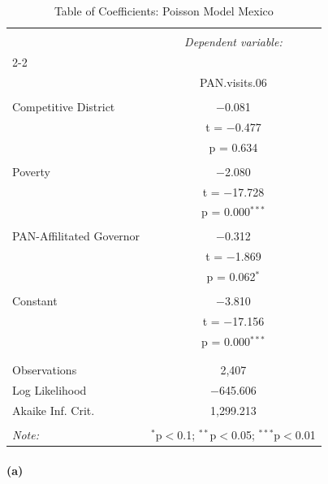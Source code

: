 \documentclass[12pt,letterpaper]{article}
\begin{document}
\begin{table}[!htbp] \centering 
	\caption{Table of Coefficients: Poisson Model Mexico} 
	\label{} 
	\begin{tabular}{@{\extracolsep{5pt}}lc} 
		\\[-1.8ex]\hline 
		\hline \\[-1.8ex] 
		& \multicolumn{1}{c}{\textit{Dependent variable:}} \\ 
		\cline{2-2} 
		\\[-1.8ex] & PAN.visits.06 \\ 
		\hline \\[-1.8ex] 
		Competitive District & $-$0.081 \\ 
		& t = $-$0.477 \\ 
		& p = 0.634 \\ 
		& \\ 
		Poverty & $-$2.080 \\ 
		& t = $-$17.728 \\ 
		& p = 0.000$^{***}$ \\ 
		& \\ 
		PAN-Affilitated Governor & $-$0.312 \\ 
		& t = $-$1.869 \\ 
		& p = 0.062$^{*}$ \\ 
		& \\ 
		Constant & $-$3.810 \\ 
		& t = $-$17.156 \\ 
		& p = 0.000$^{***}$ \\ 
		& \\ 
		\hline \\[-1.8ex] 
		Observations & 2,407 \\ 
		Log Likelihood & $-$645.606 \\ 
		Akaike Inf. Crit. & 1,299.213 \\ 
		\hline 
		\hline \\[-1.8ex] 
		\textit{Note:}  & \multicolumn{1}{r}{$^{*}$p$<$0.1; $^{**}$p$<$0.05; $^{***}$p$<$0.01} \\ 
	\end{tabular} 
\end{table} 



\paragraph{(a)}
\end{document}
